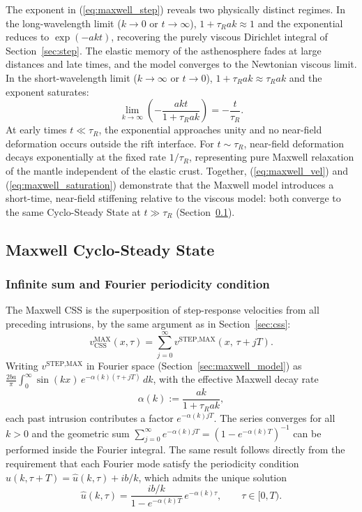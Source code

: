 \documentclass[extra]{gji}
\begin{document}
The exponent in (\ref{eq:maxwell_step}) reveals two physically distinct regimes.
In the long-wavelength limit ($k\to 0$ or $t\to\infty$), $1+\tau_R ak \approx 1$
and the exponential reduces to $\exp(-akt)$, recovering the purely viscous
Dirichlet integral of Section~\ref{sec:step}. The elastic memory of the
asthenosphere fades at large distances and late times, and the model converges
to the Newtonian viscous limit. In the short-wavelength limit ($k\to\infty$ or
$t\to 0$), $1+\tau_R ak \approx \tau_R ak$ and the exponent saturates:
\begin{equation}
\lim_{k\to\infty}\left(-\frac{akt}{1+\tau_R ak}\right) = -\frac{t}{\tau_R}.
\label{eq:maxwell_saturation}
\end{equation}
At early times $t\ll\tau_R$, the exponential approaches unity and no near-field
deformation occurs outside the rift interface. For $t\sim\tau_R$, near-field
deformation decays exponentially at the fixed rate $1/\tau_R$, representing
pure Maxwell relaxation of the mantle independent of the elastic crust.
Together, (\ref{eq:maxwell_vel}) and (\ref{eq:maxwell_saturation}) demonstrate
that the Maxwell model introduces a short-time, near-field stiffening relative
to the viscous model: both converge to the same Cyclo-Steady State at
$t\gg\tau_R$ (Section~\ref{sec:maxwell_css}).

\subsection{Maxwell Cyclo-Steady State}
\label{sec:maxwell_css}

\subsubsection{Infinite sum and Fourier periodicity condition}

The Maxwell CSS is the superposition of step-response velocities from all
preceding intrusions, by the same argument as in Section~\ref{sec:css}:
\begin{equation}
  v_{\text{CSS}}^{\text{MAX}}(x,\tau)
  = \sum_{j=0}^{\infty} v^{\text{STEP,MAX}}(x,\,\tau + jT).
\end{equation}
Writing $v^{\text{STEP,MAX}}$ in Fourier space
(Section~\ref{sec:maxwell_model}) as
$\frac{2b a}{\pi}\int_0^\infty \sin(kx)\,e^{-\alpha(k)(\tau+jT)}\,dk$,
with the effective Maxwell decay rate
\begin{equation}
  \alpha(k) := \frac{ak}{1+\tau_R ak},
  \label{eq:alpha_k}
\end{equation}
each past intrusion contributes a factor $e^{-\alpha(k)jT}$.  The series
converges for all $k>0$ and the geometric sum
$\sum_{j=0}^{\infty}e^{-\alpha(k)jT} = (1-e^{-\alpha(k)T})^{-1}$ can be
performed inside the Fourier integral.  The same result follows directly
from the requirement that each Fourier mode satisfy the periodicity
condition $\hat{u}(k,\tau+T) = \hat{u}(k,\tau) + ib/k$, which
admits the unique solution
\begin{equation}
  \hat{u}(k,\tau) = \frac{ib/k}{1-e^{-\alpha(k)T}}\,e^{-\alpha(k)\tau},
  \qquad \tau\in[0,T).
  \label{eq:maxwell_css_fourier}
\end{equation}
\end{document}
